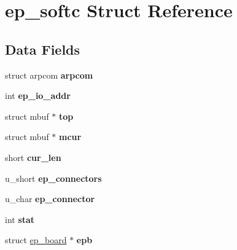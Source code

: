 \hypertarget{structep__softc}{}\section{ep\+\_\+softc Struct Reference}
\label{structep__softc}
\subsection*{Data Fields}
\begin{DoxyCompactItemize}
\item 
\mbox{\label{structep__softc_a957a26c3d9ef553c870529480bc19a08}} 
struct arpcom {\bfseries arpcom}
\item 
\mbox{\label{structep__softc_a3dd0f4b5f46f3f3b534df4b025536cdb}} 
int {\bfseries ep\+\_\+io\+\_\+addr}
\item 
\mbox{\label{structep__softc_a9c89342861ad2e0992f56e8367bb857a}} 
struct mbuf $\ast$ {\bfseries top}
\item 
\mbox{\label{structep__softc_a735502771ea08334e00bb17b0e3b2a6b}} 
struct mbuf $\ast$ {\bfseries mcur}
\item 
\mbox{\label{structep__softc_a9faf8f4c2e82b2282caca528f710df85}} 
short {\bfseries cur\+\_\+len}
\item 
\mbox{\label{structep__softc_a4eab97f30ef7cff6d562e7e2d2bfdde5}} 
u\+\_\+short {\bfseries ep\+\_\+connectors}
\item 
\mbox{\label{structep__softc_a5c6282383dfec26817b434a3d8bde1c8}} 
u\+\_\+char {\bfseries ep\+\_\+connector}
\item 
\mbox{\label{structep__softc_a0dac4cdd58c5b9ad5a8227edb3478db1}} 
int {\bfseries stat}
\item 
\mbox{\label{structep__softc_a8349eefe00243a08bcf09d28ef153568}} 
struct \mbox{\hyperlink{structep__board}{ep\+\_\+board}} $\ast$ {\bfseries epb}
\item 
\mbox{\label{structep__softc_ad3904d54d5cb31f27d430878565ae96e}} 

\end{DoxyCompactItemize}
